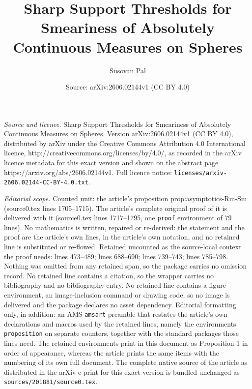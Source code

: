 \documentclass[10pt,a4paper]{amsart}
\title{Sharp Support Thresholds for Smeariness of Absolutely Continuous Measures on Spheres}
\author{Susovan Pal}
\date{Source: arXiv:2606.02144v1 (CC BY 4.0)}
\begin{document}
\maketitle

\noindent\emph{Source and licence.} Sharp Support Thresholds for Smeariness of Absolutely Continuous Measures on Spheres. Version arXiv:2606.02144v1 (CC BY 4.0), distributed by arXiv under the Creative Commons Attribution 4.0 International licence, http://creativecommons.org/licenses/by/4.0/, as recorded in the arXiv licence metadata for this exact version and shown on the abstract page https://arxiv.org/abs/2606.02144v1. Full licence notice: \texttt{licenses/arxiv-2606.02144-CC-BY-4.0.txt}.\par\smallskip

\noindent\textit{Editorial scope.} Counted unit: the article's proposition prop:asymptotics-Rm-Sm (source0.tex lines 1705--1715). The article's complete original proof of it is delivered with it (source0.tex lines 1717--1795, one \texttt{proof} environment of 79 lines). No mathematics is written, repaired or re-derived: the statement and the proof are the article's own lines, in the article's own notation, and no retained line is substituted or re-flowed.  Retained uncounted as the source-local context the proof needs: lines 473--489; lines 688--690; lines 739--743; lines 785--798.  Nothing was omitted from any retained span, so the package carries no omission record.  No retained line contains a citation, so the wrapper carries no bibliography and no bibliography entry.  No retained line contains a figure environment, an image-inclusion command or drawing code, so no image is delivered and the package declares no asset dependency.  Editorial formatting only, in addition: an AMS \texttt{amsart} preamble that restates the article's own declarations and macros used by the retained lines, namely the environments \texttt{proposition} on separate counters, together with the standard packages those lines need.  The retained environments print in this document as Proposition 1 in order of appearance, whereas the article prints the same items with the numbering of its own full document.  The complete native source of the article as distributed in the arXiv e-print for this exact version is bundled unchanged as \texttt{sources/201881/source0.tex}.
\end{document}
